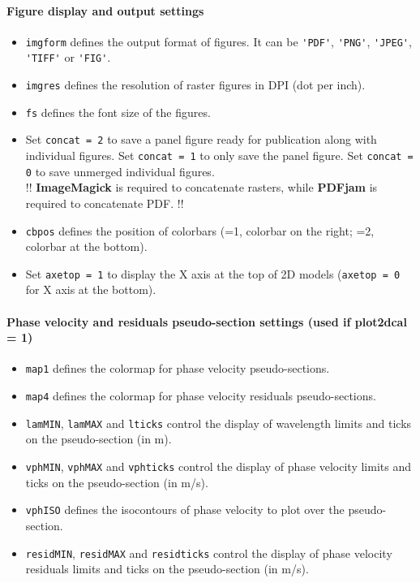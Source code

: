 \documentclass[twoside,a4paper]{article}
\def\ImageMagick{\textbf{ImageMagick}}
\def\PDFjam{\textbf{PDFjam}}
\begin{document}
\paragraph{Figure display and output settings}
\begin{itemize}[leftmargin=*]
\setlength\itemsep{2ex}
\item \verb|imgform| defines the output format of figures. It can be \verb|'PDF'|, \verb|'PNG'|, \verb|'JPEG'|, \verb|'TIFF'| or \verb|'FIG'|.

\item \verb|imgres| defines the resolution of raster figures in DPI (dot per inch).

\item \verb|fs| defines the font size of the figures.

\item Set \verb|concat = 2| to save a panel figure ready for publication along with individual figures. Set \verb|concat = 1| to only save the panel figure. Set \verb|concat = 0| to save unmerged individual figures.\\[1ex]
!! {\ImageMagick} is required to concatenate rasters, while {\PDFjam} is required to concatenate PDF. !!

\item \verb|cbpos| defines the position of colorbars (=1, colorbar on the right; =2, colorbar at the bottom).

\item Set \verb|axetop = 1| to display the X axis at the top of 2D models (\verb|axetop = 0| for X axis at the bottom).
\end{itemize}

\paragraph{Phase velocity and residuals pseudo-section settings (used if plot2dcal = 1)}
\begin{itemize}[leftmargin=*]
\setlength\itemsep{2ex}
\item \verb|map1| defines the colormap for phase velocity pseudo-sections.

\item \verb|map4| defines the colormap for phase velocity residuals pseudo-sections.

\item \verb|lamMIN|, \verb|lamMAX| and \verb|lticks| control the display of wavelength limits and ticks on the pseudo-section (in m).

\item \verb|vphMIN|, \verb|vphMAX| and \verb|vphticks| control the display of phase velocity limits and ticks on the pseudo-section (in m/s).

\item \verb|vphISO| defines the isocontours of phase velocity to plot over the pseudo-section.

\item \verb|residMIN|, \verb|residMAX| and \verb|residticks| control the display of phase velocity residuals limits and ticks on the pseudo-section (in m/s).
\end{itemize}
\end{document}
